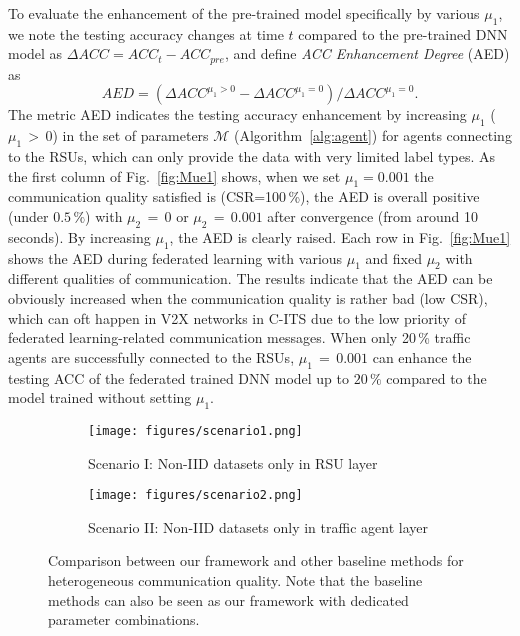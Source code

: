 To evaluate the enhancement of the pre-trained model specifically by various $\mu_1$, we note the testing accuracy changes at time $t$ compared to the pre-trained DNN model as $\Delta ACC = ACC_t-ACC_{pre}$, and define \emph{ACC Enhancement Degree} (AED) as
\begin{equation}
    \label{Eq:AED}
    AED = (\Delta ACC^{\mu_1>0} - \Delta ACC^{\mu_1=0}) / \Delta ACC^{\mu_1=0}.
\end{equation}
The metric AED indicates the testing accuracy enhancement by increasing $\mu_1$ ($\mu_1\,>\,0$) in the set of parameters $\mathcal{M}$ (Algorithm~\ref{alg:agent}) for agents connecting to the RSUs, which can only provide the data with very limited label types. As the first column of Fig.~\ref{fig:Mue1} shows, when we set $\mu_1=0.001$ the communication quality satisfied is (CSR=100\,\%), the AED is overall positive (under $0.5\,\%$) with $\mu_2\,=\,0$ or $\mu_2\,=\,0.001$ after convergence (from around 10\,seconds). By increasing $\mu_1$, the AED is clearly raised. Each row in Fig.~\ref{fig:Mue1} shows the AED during federated learning with various $\mu_1$ and fixed $\mu_2$ with different qualities of communication. The results indicate that the AED can be obviously increased when the communication quality is rather bad (low CSR), which can oft happen in V2X networks in C-ITS due to the low priority of federated learning-related communication messages. When only 20\,\% traffic agents are successfully connected to the RSUs, $\mu_1\,=\,0.001$ can enhance the testing ACC of the federated trained DNN model up to $20\,\%$ compared to the model trained without setting $\mu_1$. 

\begin{figure*}[ht]
\centering
\begin{subfigure}[b]{0.45\textwidth}
   \texttt{[image: figures/scenario1.png]}
   \caption{\centering Scenario I: Non-IID datasets only in RSU layer}
   \label{fig:scenario1} 
\end{subfigure}
\begin{subfigure}[b]{0.45\textwidth}
   \texttt{[image: figures/scenario2.png]}
   \caption{\centering Scenario II: Non-IID datasets only in traffic agent layer}
   \label{fig:scenario2}
\end{subfigure}
\vspace{2mm}
\caption{\centering Comparison between our framework {\myHFed} and other baseline methods for heterogeneous communication quality. Note that the baseline methods can also be seen as our framework with dedicated parameter combinations.}
\label{fig:HW}
\vspace{-0.3cm}
\end{figure*}

